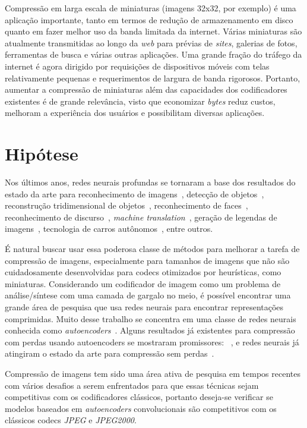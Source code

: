 Compressão em larga escala de miniaturas (imagens 32x32, por exemplo) é uma aplicação importante, tanto em termos de redução de armazenamento em disco quanto em fazer melhor uso da banda limitada da internet. Várias miniaturas são atualmente transmitidas ao longo da \textit{web} para prévias de \textit{sites}, galerias de fotos, ferramentas de busca e várias outras aplicações. Uma grande fração do tráfego da internet é agora dirigido por requisições de dispositivos móveis com telas relativamente pequenas e requerimentos de largura de banda rigorosos. Portanto, aumentar a compressão de miniaturas além das capacidades dos codificadores existentes é de grande relevância, visto que economizar \textit{bytes} reduz custos, melhoram a experiência dos usuários e possibilitam diversas aplicações.
\section{Hipótese}
\label{sec:hipotese}
Nos últimos anos, redes neurais profundas se tornaram a base dos resultados do estado da arte para reconhecimento de imagens~\cite{simonyan}, detecção de objetos~\cite{girshick2014rich}, reconstrução tridimensional de objetos~\cite{choy20163d}, reconhecimento de faces~\cite{deepface}, reconhecimento de discurso~\cite{graves}, \textit{machine translation}~\cite{sequence}, geração de legendas de imagens~\cite{vinyals2015show}, tecnologia de carros autônomos~\cite{huval2015empirical}, entre outros. 

É natural buscar usar essa poderosa classe de métodos para melhorar a tarefa de compressão de imagens, especialmente para tamanhos de imagens que não são cuidadosamente desenvolvidas para codecs otimizados por heurísticas, como miniaturas. Considerando um codificador de imagem como um problema de análise/síntese com uma camada de gargalo no meio, é possível encontrar uma grande área de pesquisa que usa redes neurais para encontrar representações comprimidas. Muito desse trabalho se concentra em uma classe de redes neurais conhecida como \emph{autoencoders}~\cite{autoencoder2011}. Alguns resultados já existentes para compressão com perdas usando autoencoders se mostraram promissores: ~\cite{gregor2016towards, FullResolution2017Toderici, Variable2016Toderici}, e redes neurais já atingiram o estado da arte para compressão sem perdas~\cite{mentzer2019, theis2015generative}. 

Compressão de imagens tem sido uma área ativa de pesquisa em tempos recentes com vários desafios a serem enfrentados para que essas técnicas sejam competitivas com os codificadores clássicos, portanto deseja-se verificar se modelos baseados em \textit{autoencoders} convolucionais são competitivos com os clássicos codecs \textit{JPEG} e \textit{JPEG2000}. 
